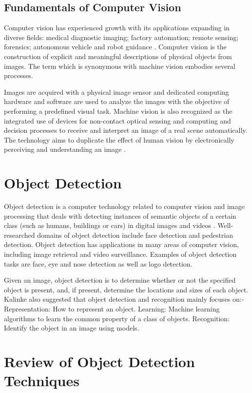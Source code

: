 \subsection{Fundamentals of Computer Vision}
Computer vision has experienced growth with its applications expanding in diverse fields: medical diagnostic imaging; factory automation; remote sensing; forensics; autonomous vehicle and robot guidance  \cite{landau}. Computer vision is the construction of explicit and meaningful descriptions of physical objects from images. The term which is synonymous with machine vision embodies several processes. 

Images are acquired with a physical image sensor and dedicated computing hardware and software are used to analyze the images with the objective of performing a predefined visual task. Machine vision is also recognized as the integrated use of devices for non-contact optical sensing and computing and decision processes to receive and interpret an image of a real scene automatically. The technology aims to duplicate the effect of human vision by electronically perceiving and understanding an image  \cite{articleX}. 

\section{Object Detection}
Object detection is a computer technology related to computer vision and image processing that deals with detecting instances of semantic objects of a certain class (such as humans, buildings or cars) in digital images and videos  \cite{bulgac}. Well-researched domains of object detection include face detection and pedestrian detection. Object detection has applications in many areas of computer vision, including image retrieval and video surveillance. Examples of object detection tasks are face, eye and nose detection as well as logo detection.

Given an image, object detection is to determine whether or not the specified object is present, and, if present, determine the locations and sizes of each object. 
Kalinke also suggested that object detection and recognition mainly focuses on:-
Representation: How to represent an object.
Learning: Machine learning algorithms to learn the common property of a class of objects. 
Recognition: Identify the object in an image using models. 


\section{Review of Object Detection Techniques}
